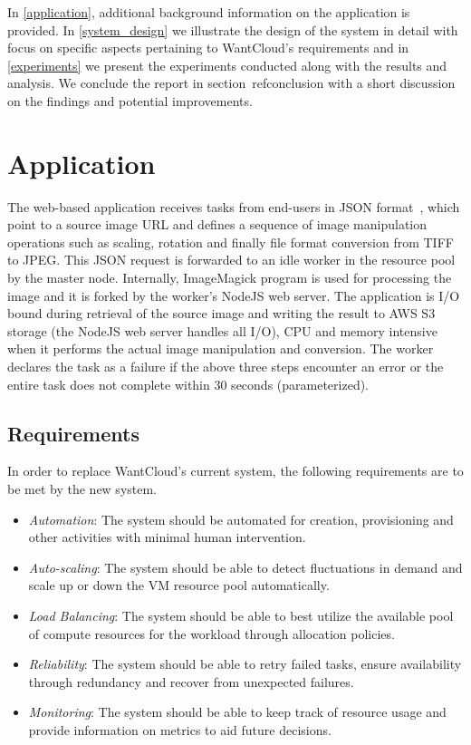 \documentclass[a4paper]{IEEEtran}
\begin{document}
In \autoref{application}, additional background information on the application is provided. In \autoref{system_design} we illustrate the design of the system in detail with focus on specific aspects pertaining to
WantCloud's requirements and in \autoref{experiments} we present the experiments conducted along with the
results and analysis. We conclude the report in section~ref{conclusion} with a short discussion on the findings and potential improvements.

\section{Application} \label{application}

The web-based application receives tasks from end-users in JSON format~\cite{rfc7159}, which point to a source image URL and defines a sequence of image manipulation operations such as scaling, rotation and finally file format conversion from TIFF to JPEG. This JSON request is forwarded to an idle worker in the resource pool by the master node. Internally, ImageMagick program is used for processing the image and it is forked by the worker's NodeJS web server. The application is I/O bound during retrieval of the source image and writing the result to AWS S3 storage (the NodeJS web server handles all I/O), CPU and memory intensive when it performs the actual image manipulation and conversion. The worker declares the task as a failure if the above three steps encounter an error or the entire 
task does not complete within 30 seconds (parameterized).

\subsection{Requirements}

In order to replace WantCloud's current system, the following requirements are to be met by the new system.

\begin{itemize}
  \item \emph{Automation}: The system should be automated for creation, provisioning and other activities
  with minimal human intervention.
  \item \emph{Auto-scaling}: The system should be able to detect fluctuations in demand and scale up or down the VM resource pool automatically.
  \item \emph{Load Balancing}: The system should be able to best utilize the available pool of compute resources
  for the workload through allocation policies.
  \item \emph{Reliability}: The system should be able to retry failed tasks, ensure availability through redundancy and recover from unexpected failures.
  \item \emph{Monitoring}: The system should be able to keep track of resource usage and provide information
  on metrics to aid future decisions.
\end{itemize}
\end{document}
